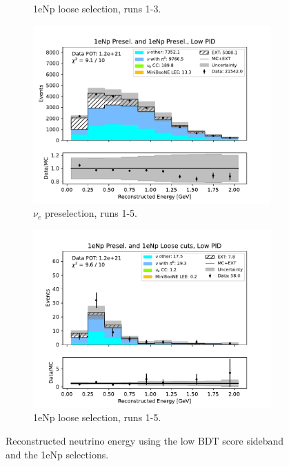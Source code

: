 \begin{figure}[H]
\begin{subfigure}{0.5\linewidth}
        \caption{1eNp loose selection, runs 1-3.}
    \end{subfigure}
    \begin{subfigure}{0.5\linewidth}
        \includegraphics[width=\linewidth]{technote/Sidebands/Figures/FarSideband/far_sideband_reco_e_run1234a4b4c4d5_NP_NP_LOW_PID.pdf}
        \caption{$\nu_e$ preselection, runs 1-5.}
    \end{subfigure}%
    \begin{subfigure}{0.5\linewidth}
        \includegraphics[width=\linewidth]{technote/Sidebands/Figures/FarSideband/far_sideband_reco_e_run1234a4b4c4d5_NP_NPL_LOW_PID.pdf}
        \caption{1eNp loose selection, runs 1-5.}
    \end{subfigure}
    \caption{Reconstructed neutrino energy using the low BDT score sideband and the 1eNp selections.}
\end{figure}

